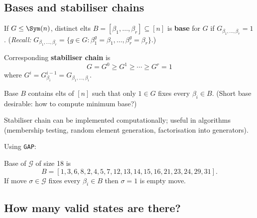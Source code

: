 \subsection{Bases and stabiliser chains}

\begin{slide}
    \begin{definition}
        \vspace{0pt}
        If $G \leq \Sym(n)$, distinct elts $B = [\beta_1,\dotsc,\beta_r] \subseteq [n]$ is \textbf{base} for $G$ if $G_{\beta_1,\dotsc,\beta_r} = 1$. (\textit{Recall:} $G_{\beta_1,\dotsc,\beta_r} = \{g \in G : \beta_1^g = \beta_1,\dotsc,\beta_r^g = \beta_r\}$.) \pause

        Corresponding \textbf{stabiliser chain} is
        \[G = G^0 \geq G^1 \geq \dotsb \geq G^r = 1\]
        where $G^i = G^{i-1}_{\beta_i} = G_{\beta_1,\dotsc,\beta_i}$.
    \end{definition} \pause

    Base $B$ contains elts of $[n]$ such that only $1 \in G$ fixes every $\beta_i \in B$. (Short base desirable: how to compute minimum base?) \pause

    Stabiliser chain can be implemented computationally; useful in algorithms (membership testing, random element generation, factorisation into generators).
\end{slide}

\begin{slide}
    \begin{example}
        \vspace{0pt}
        Using \texttt{GAP}:

         \pause

        Base of $\mathcal{G}$ of size 18 is
        $$B = [ 1, 3, 6, 8, 2, 4, 5, 7, 12, 13, 14, 15, 16, 21, 23, 24, 29, 31 ].$$ \pause
        If move $\sigma \in \mathcal{G}$ fixes every $\beta_i \in B$ then $\sigma = 1$ is empty move.
    \end{example}
\end{slide}

\subsection{How many valid states are there?}

